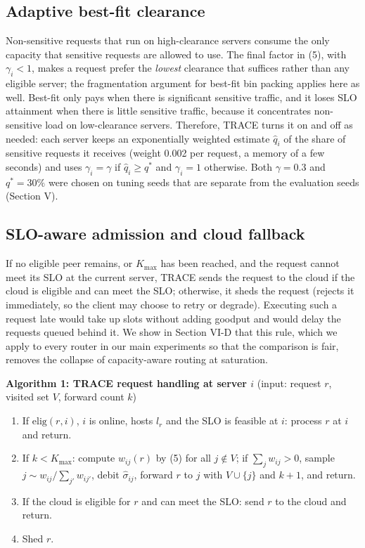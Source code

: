 \documentclass[journal]{IEEEtran}
\begin{document}
\subsection{Adaptive best-fit clearance}

Non-sensitive requests that run on high-clearance servers consume the only capacity that sensitive requests are allowed to use. The final factor in (5), with \(\gamma_i<1\), makes a request prefer the \emph{lowest} clearance that suffices rather than any eligible server; the fragmentation argument for best-fit bin packing applies here as well. Best-fit only pays when there is significant sensitive traffic, and it loses SLO attainment when there is little sensitive traffic, because it concentrates non-sensitive load on low-clearance servers. Therefore, TRACE turns it on and off as needed: each server keeps an exponentially weighted estimate \(\hat q_i\) of the share of sensitive requests it receives (weight 0.002 per request, a memory of a few seconds) and uses \(\gamma_i=\gamma\) if \(\hat q_i\ge q^\ast\) and \(\gamma_i=1\) otherwise. Both \(\gamma=0.3\) and \(q^\ast=30\%\) were chosen on tuning seeds that are separate from the evaluation seeds (Section V).

\subsection{SLO-aware admission and cloud fallback}

If no eligible peer remains, or \(K_{\max}\) has been reached, and the request cannot meet its SLO at the current server, TRACE sends the request to the cloud if the cloud is eligible and can meet the SLO; otherwise, it sheds the request (rejects it immediately, so the client may choose to retry or degrade). Executing such a request late would take up slots without adding goodput and would delay the requests queued behind it. We show in Section VI-D that this rule, which we apply to every router in our main experiments so that the comparison is fair, removes the collapse of capacity-aware routing at saturation.

\textbf{Algorithm 1: TRACE request handling at server \(i\)} (input: request \(r\), visited set \(V\), forward count \(k\))

\begin{enumerate}
\def\labelenumi{\arabic{enumi}.}
\item
  If \(\mathrm{elig}(r,i)\), \(i\) is online, hosts \(l_r\) and the SLO is feasible at \(i\): process \(r\) at \(i\) and return.
\item
  If \(k<K_{\max}\): compute \(w_{ij}(r)\) by (5) for all \(j\notin V\); if \(\sum_j w_{ij}>0\), sample \(j\sim w_{ij}/\sum_{j'}w_{ij'}\), debit \(\hat\sigma_{ij}\), forward \(r\) to \(j\) with \(V\cup\{j\}\) and \(k+1\), and return.
\item
  If the cloud is eligible for \(r\) and can meet the SLO: send \(r\) to the cloud and return.
\item
  Shed \(r\).
\end{enumerate}
\end{document}
